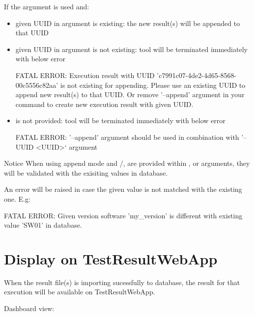 If the argument  is used and:
\begin{itemize}
  \item given UUID in  argument is existing: the new result(s) will be appended to that UUID
  \item given UUID in  argument is not existing: tool will be terminated immediately with below error
\begin{robotlog}
FATAL ERROR: Execution result with UUID 'c7991c07-4de2-4d65-8568-00c5556c82aa' is not existing for appending.
             Please use an existing UUID to append new result(s) to that UUID.
             Or remove '--append' argument in your command to create new execution result with given UUID.
\end{robotlog}
  \item {} is not provided: tool will be terminated immediately with below error
\begin{robotlog}
FATAL ERROR: '--append' argument should be used in combination with '--UUID <UUID>` argument
\end{robotlog}
\end{itemize} 

\begin{boxhint} {Notice}
When using append mode and /,  are provided within , 
 or  arguments, they will be validated with the exisiting
values in database. 

An error will be raised in case the given value is not matched with the existing one. E.g:
\begin{robotlog}
FATAL ERROR: Given version software 'my_version' is different with existing value 'SW01' in database.
\end{robotlog}
\end{boxhint}

\newpage
\hypertarget{display-on-testresultwebapp}{%
\section{Display on
TestResultWebApp}\label{display-on-testresultwebapp}}

When the result file(s) is importing sucessfully to database, the result
for that execution will be available on TestResultWebApp.

Dashboard view:

